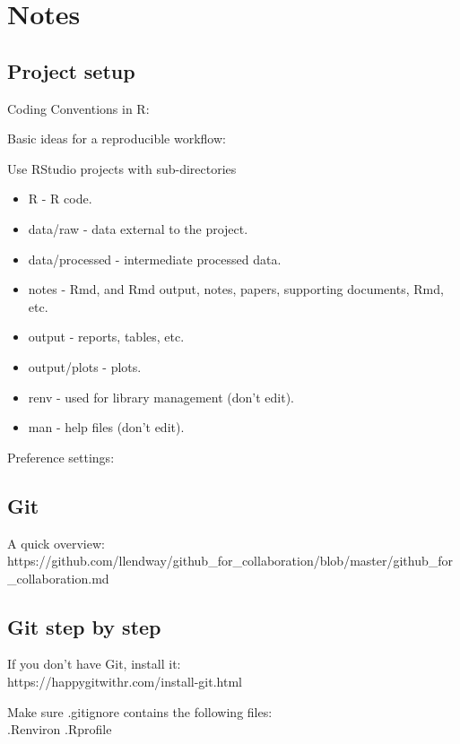 \documentclass[
  letterpaper,
  DIV=11,
  numbers=noendperiod]{scrreport}
\providecommand{\tightlist}{%
  \setlength{\itemsep}{0pt}\setlength{\parskip}{0pt}}\usepackage{longtable,booktabs,array}
\begin{document}

\chapter{Notes}\label{notes}

\section{Project setup}\label{project-setup}

Coding Conventions in R:

Basic ideas for a reproducible workflow:

Use RStudio projects with sub-directories

\begin{itemize}
\tightlist
\item
  R - R code.
\item
  data/raw - data external to the project.
\item
  data/processed - intermediate processed data.
\item
  notes - Rmd, and Rmd output, notes, papers, supporting documents, Rmd,
  etc.
\item
  output - reports, tables, etc.
\item
  output/plots - plots.
\item
  renv - used for library management (don't edit).
\item
  man - help files (don't edit).
\end{itemize}

Preference settings:

\section{Git}\label{git}

A quick overview:
https://github.com/llendway/github\_for\_collaboration/blob/master/github\_for\_collaboration.md

\section{Git step by step}\label{git-step-by-step}

If you don't have Git, install it:\\
https://happygitwithr.com/install-git.html

Make sure .gitignore contains the following files:\\
.Renviron .Rprofile
\end{document}

